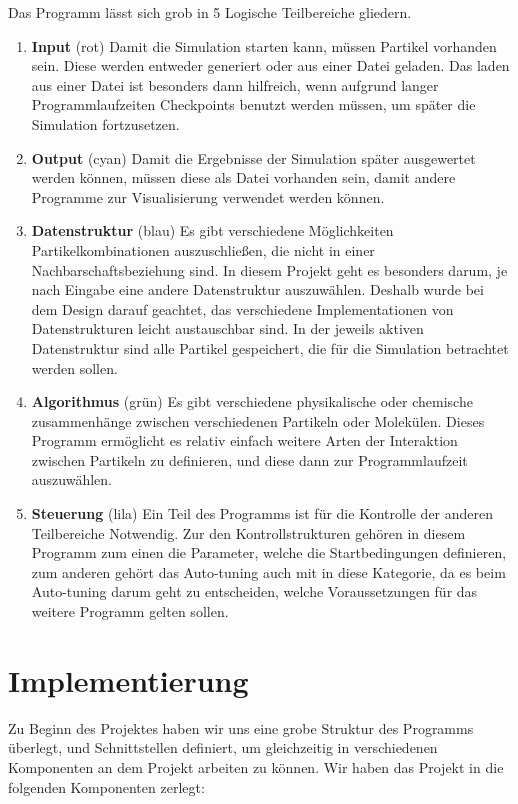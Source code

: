 \documentclass[
	12pt,
	a4paper,
	BCOR10mm,
	DIV14,
	headsepline,
]{scrreprt}
\begin{document}
Das Programm lässt sich grob in 5 Logische Teilbereiche gliedern.
\begin{enumerate}
	\item \textbf{Input} (rot) Damit die Simulation starten kann, müssen Partikel vorhanden sein. Diese werden entweder generiert oder aus einer Datei geladen. Das laden aus einer Datei ist besonders dann hilfreich, wenn aufgrund langer Programmlaufzeiten Checkpoints benutzt werden müssen, um später die Simulation fortzusetzen.
	\item \textbf{Output} (cyan) Damit die Ergebnisse der Simulation später ausgewertet werden können, müssen diese als Datei vorhanden sein, damit andere Programme zur Visualisierung verwendet werden können.
	\item \textbf{Datenstruktur} (blau) Es gibt verschiedene Möglichkeiten Partikelkombinationen auszuschließen, die nicht in einer Nachbarschaftsbeziehung sind. In diesem Projekt geht es besonders darum, je nach Eingabe eine andere Datenstruktur auszuwählen. Deshalb wurde bei dem Design darauf geachtet, das verschiedene Implementationen von Datenstrukturen leicht austauschbar sind. In der jeweils aktiven Datenstruktur sind alle Partikel gespeichert, die für die Simulation betrachtet werden sollen.
	\item \textbf{Algorithmus} (grün) Es gibt verschiedene physikalische oder chemische zusammenhänge zwischen verschiedenen Partikeln oder Molekülen. Dieses Programm ermöglicht es relativ einfach weitere Arten der Interaktion zwischen Partikeln zu definieren, und diese dann zur Programmlaufzeit auszuwählen.
	\item \textbf{Steuerung} (lila) Ein Teil des Programms ist für die Kontrolle der anderen Teilbereiche Notwendig. Zur den Kontrollstrukturen gehören in diesem Programm zum einen die Parameter, welche die Startbedingungen definieren, zum anderen gehört das Auto-tuning auch mit in diese Kategorie, da es beim Auto-tuning darum geht zu entscheiden, welche Voraussetzungen für das weitere Programm gelten sollen.
\end{enumerate}

\section{Implementierung}
Zu Beginn des Projektes haben wir uns eine grobe Struktur des Programms überlegt, und Schnittstellen definiert, um gleichzeitig in verschiedenen Komponenten an dem Projekt arbeiten zu können. Wir haben das Projekt in die folgenden Komponenten zerlegt:
\end{document}
